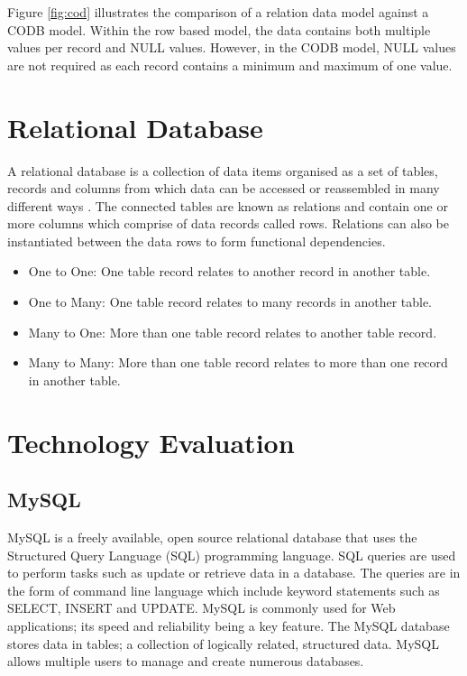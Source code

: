 Figure \ref{fig:cod} illustrates the comparison of a relation data model against a CODB model. Within the row based model, the data contains both multiple values per record and NULL values. However, in the CODB model, NULL values are not required as each record contains a minimum and maximum of one value.

\section{Relational Database}
A relational database is a collection of data items organised as a set of tables, records and columns from which data can be accessed or reassembled in many different ways \cite{rdb}. The connected tables are known as relations and contain one or more columns which comprise of data records called rows. Relations can also be instantiated between the data rows to form functional dependencies.

\begin{itemize}
\item One to One: One table record relates to another record in another table.
\item One to Many: One table record relates to many records in another table.
\item Many to One: More than one table record relates to another table record.
\item Many to Many: More than one table record relates to more than one record in another table.
\end{itemize}


\section{Technology Evaluation}\label{techeval}
\subsection{MySQL}\label{mysql}
MySQL is a freely available, open source relational database that uses the Structured Query Language (SQL) programming language. SQL queries are used to perform tasks such as update or retrieve data in a database. The queries are in the form of command line language which include keyword statements such as SELECT, INSERT and UPDATE. MySQL is commonly used for Web applications; its speed and reliability being a key feature. The MySQL database stores data in tables; a collection of logically related, structured data. MySQL allows multiple users to manage and create numerous databases.

